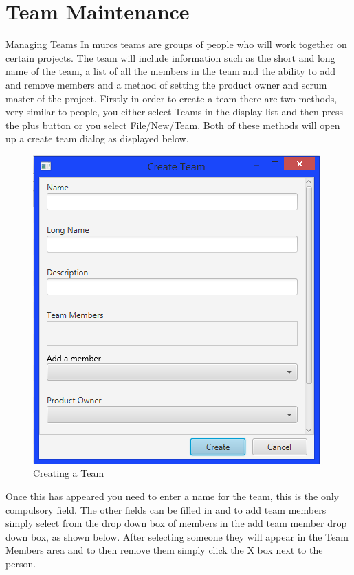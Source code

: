 \section{Team Maintenance}

Managing Teams
\newline\newline
In murcs teams are groups of people who will work together on certain projects. The team will include information such as the short and long name of the team, a list of all the members in the team and the ability to add and remove members and a method of setting the product owner and scrum master of the project.
\newline
Firstly in order to create a team there are two methods, very similar to people, you either select Teams in the display list and then press the plus button or you select File/New/Team. Both of these methods will open up a create team dialog as displayed below.

\begin{figure}[H]
\centering
\includegraphics[width=\textwidth]{images/screenshots/teams1.PNG}
\caption{Creating a Team}
\label{fig:new_project}
\end{figure}

Once this has appeared you need to enter a name for the team, this is the only compulsory field. The other fields can be filled in and to add team members simply select from the drop down box of members in the add team member drop down box, as shown below. After selecting someone they will appear in the Team Members area and to then remove them simply click the X box next to the person.

